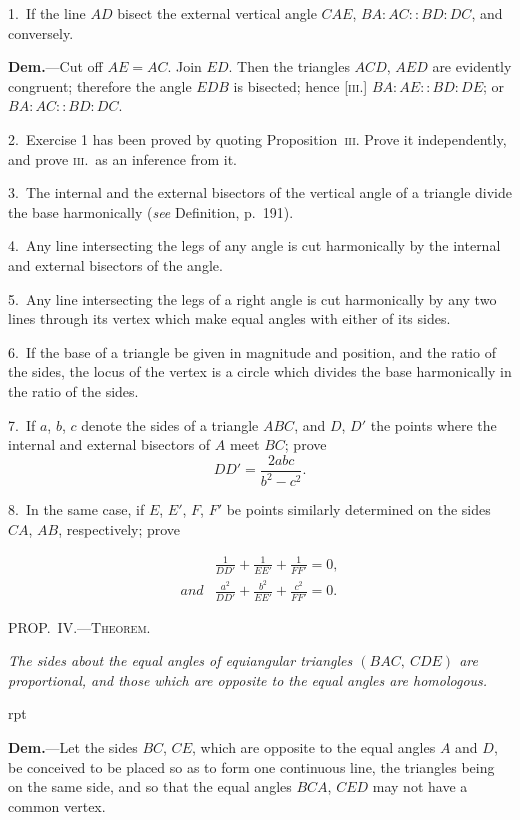 \documentclass[oneside]{book}
\newcounter{wrapwidth}
\newcommand\mypropl[2]{
\bigskip\Needspace*{4\baselineskip}\begin{center}\textsc{#1}\end{center}
\hspace{\parindent}\emph{#2}\par\medskip
}
\newcommand\imgflow[3]{
\setcounter{wrapwidth}{#1}

\begin{wrapfigure}[#2]{r}{\value{wrapwidth}pt}
\begin{center}
\vspace{-0.3in}

\end{center}
\end{wrapfigure}
}
\begin{document}
\begin{footnotesize}
1.~If the line $AD$ bisect the external vertical angle $CAE$,
$BA : AC :: BD : DC$, and conversely.

\textbf{Dem.}---Cut off $AE = AC$. Join
$ED$. Then the triangles $ACD$,
$AED$ are evidently congruent;
therefore the angle $EDB$ is bisected;
hence [\textsc{iii}.] $BA : AE ::
BD : DE$; or $BA : AC :: BD : DC$.

2.~Exercise 1 has been proved
by quoting Proposition~\textsc{iii}. Prove
it independently, and prove \textsc{iii}.\ as an inference from it.

3.~The internal and the external bisectors of the vertical angle
of a triangle divide the base harmonically (\textit{see} Definition, p.~191).

4.~Any line intersecting the legs of any angle is cut harmonically
by the internal and external bisectors of the angle.


5.~Any line intersecting the legs of a right angle is cut harmonically
by any two lines through its vertex which make equal
angles with either of its sides.

6.~If the base of a triangle be given in magnitude and position,
and the ratio of the sides, the locus of the vertex is a circle which
divides the base harmonically in the ratio of the sides.

7.~If $a$, $b$, $c$ denote the sides of a triangle $ABC$, and $D$, $D'$ the
points where the internal and external bisectors of $A$ meet $BC$;
prove
\[
DD'=\frac{2abc}{b^2-c^2}.
\]

8.~In the same case, if $E$, $E'$, $F$, $F'$ be points similarly determined
on the sides $CA$, $AB$, respectively; prove

\begin{align*}
&\frac{1}{DD'}+\frac{1}{EE'}+\frac{1}{FF'}=0,\\
and &\frac{a^2}{DD'}+\frac{b^2}{EE'}+\frac{c^2}{FF'}=0.
\end{align*}
\par\end{footnotesize}

\mypropl{PROP\@.~IV\@.---Theorem.}{The sides about the equal angles of equiangular triangles
$(BAC,\ CDE)$ are proportional, and those which
are opposite to the equal angles are homologous.}


\imgflow{125}{8}{f173}

\textbf{Dem.}---Let the sides $BC$, $CE$, which are opposite to
the equal angles $A$ and $D$, be conceived to be placed so
as to form one continuous line,
the triangles being on the same
side, and so that the equal
angles $BCA$, $CED$ may not
have a common vertex.
\end{document}
